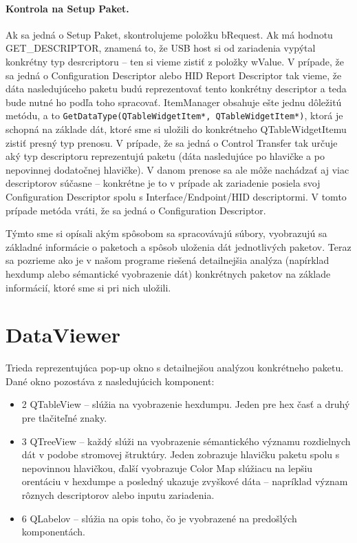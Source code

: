\paragraph{Kontrola na Setup Paket.}
\hfill \break
Ak sa jedná o Setup Paket, skontrolujeme položku bRequest. Ak má hodnotu GET\_DESCRIPTOR, znamená to, že USB host si od zariadenia vypýtal konkrétny typ desrcriptoru -- ten si vieme zistiť z položky wValue. V prípade, že sa jedná o Configuration Descriptor alebo HID Report Descriptor tak vieme, že dáta nasledujúceho paketu budú reprezentovať tento konkrétny descriptor a teda bude nutné ho podľa toho spracovať.
\hfill \break \newline
ItemManager obsahuje ešte jednu dôležitú metódu, a to \texttt{GetDataType(QTableWidgetItem*, QTableWidgetItem*)}, ktorá je schopná na základe dát, ktoré sme si uložili do konkrétneho QTableWidgetItemu zistiť presný typ prenosu. V prípade, že sa jedná o Control Transfer tak určuje aký typ descriptoru reprezentujú  paketu (dáta nasledujúce po hlavičke a po nepovinnej dodatočnej hlavičke). V danom prenose sa ale môže nachádzať aj viac descriptorov súčasne -- konkrétne je to v prípade ak zariadenie posiela svoj Configuration Descriptor spolu s Interface/Endpoint/HID descriptormi. V tomto prípade metóda vráti, že sa jedná o Configuration Descriptor.

Týmto sme si opísali akým spôsobom sa spracovávajú súbory, vyobrazujú sa základné informácie o paketoch a spôsob uloženia dát jednotlivých paketov. Teraz sa pozrieme ako je v našom programe riešená detailnejšia analýza (napírklad hexdump alebo sémantické vyobrazenie dát) konkrétnych paketov na základe informácií, ktoré sme si pri nich uložili.

\section{DataViewer}
Trieda reprezentujúca pop-up okno s detailnejšou analýzou konkrétneho paketu. Dané okno pozostáva z nasledujúcich komponent:
\begin{itemize}
\item 2 QTableView -- slúžia na vyobrazenie hexdumpu. Jeden pre hex časť a druhý pre tlačiteľné znaky.
\item 3 QTreeView -- každý slúži na vyobrazenie sémantického významu rozdielnych dát v podobe stromovej štruktúry. Jeden zobrazuje hlavičku paketu spolu s nepovinnou hlavičkou, ďalší vyobrazuje Color Map slúžiacu na lepšiu orentáciu v hexdumpe a posledný ukazuje zvyškové dáta -- napríklad význam rôznych descriptorov alebo inputu zariadenia.
\item 6 QLabelov -- slúžia na opis toho, čo je vyobrazené na predošlých komponentách. 
\end{itemize}

